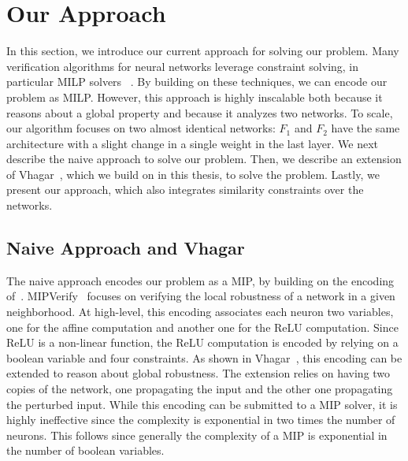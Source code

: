 
\section{Our Approach}
In this section, we introduce our current approach for solving our problem.
Many verification algorithms for neural networks leverage constraint solving, in particular MILP solvers ~\cite{VHAGAR,CFXROBUSTNESS,QEBVERIF,MIPVERIFY}.
By building on these techniques, we can encode our problem as MILP. 
However, this approach is highly inscalable both because it reasons about a global property and because it analyzes two networks.
To scale, our algorithm focuses on two almost identical networks: $F_1$ and $F_2$ have the same architecture with a slight change in a single weight in the last layer. We next describe the naive approach to solve our problem. Then, we describe an extension of Vhagar~\cite{VHAGAR}, which we build on in this thesis, to solve the problem. Lastly, we present our approach, which also integrates similarity constraints over the networks.
 


\subsection{Naive Approach and Vhagar}
The naive approach encodes our problem as a MIP, by building on the encoding of~\cite{MIPVERIFY}.
MIPVerify~\cite{MIPVERIFY} focuses on verifying the local robustness of a network in a given neighborhood.  
At high-level, this encoding associates each neuron two variables, one for the affine computation and another one for the ReLU computation. Since ReLU is a non-linear function, the ReLU computation is encoded by relying on a boolean variable and four constraints.
As shown in Vhagar~\cite{VHAGAR}, this encoding can be extended to reason about global robustness. The extension relies on having two copies of the network, one propagating the input and the other one propagating the perturbed input. 
While this encoding can be submitted to a MIP solver, it is highly ineffective since the complexity is exponential in two times the number of neurons. This follows since generally the complexity of a MIP is exponential in the number of boolean variables.
 
